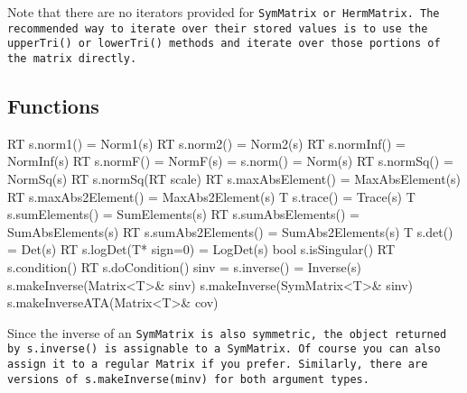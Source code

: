 Note that there are no iterators provided for \tt{SymMatrix} or \tt{HermMatrix}.  The recommended way to iterate over their stored values is to use the \tt{upperTri()} or \tt{lowerTri()} methods and iterate over those portions of the matrix directly.

\subsection{Functions}
\label{SymMatrix_Functions}

\begin{tmvcode}
RT s.norm1() = Norm1(s)
RT s.norm2() = Norm2(s) 
RT s.normInf() = NormInf(s)
RT s.normF() = NormF(s) = s.norm() = Norm(s)
RT s.normSq() = NormSq(s)
RT s.normSq(RT scale)
RT s.maxAbsElement() = MaxAbsElement(s)
RT s.maxAbs2Element() = MaxAbs2Element(s)
T s.trace() = Trace(s)
T s.sumElements() = SumElements(s)
RT s.sumAbsElements() = SumAbsElements(s)
RT s.sumAbs2Elements() = SumAbs2Elements(s)
T s.det() = Det(s)
RT s.logDet(T* sign=0) = LogDet(s)
bool s.isSingular()
RT s.condition()
RT s.doCondition()
sinv = s.inverse() = Inverse(s)
s.makeInverse(Matrix<T>& sinv)
s.makeInverse(SymMatrix<T>& sinv)
s.makeInverseATA(Matrix<T>& cov)
\end{tmvcode}
Since the inverse of an \tt{SymMatrix} is also symmetric,
the object returned by \tt{s.inverse()} is 
assignable to a \tt{SymMatrix}.  Of course you can also assign it
to a regular \tt{Matrix} if you prefer.  Similarly, there are versions
of \tt{s.makeInverse(minv)} for both argument types.  


